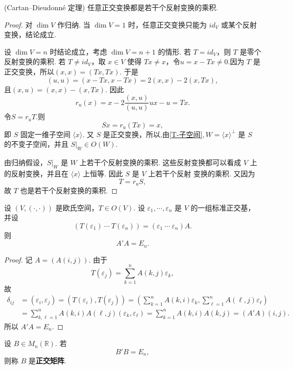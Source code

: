 \begin{proposition}
	(Cartan--Dieudonn\'e 定理)
	任意正交变换都是若干个反射变换的乘积.
\end{proposition}
\begin{proof}
	 对 $\dim V$ 作归纳.
	当 $\dim V=1$ 时，任意正交变换只能为 $id_V$ 或某个反射变换，结论成立.
	
	设 $\dim V=n$ 时结论成立，考虑 $\dim V=n+1$ 的情形.
	若 $T=id_V$，则 $T$ 是零个反射变换的乘积. 若 $T\neq id_V$，取 $x\in V$ 使得
	$Tx\neq x$，令$u=x-Tx\neq 0. $因为 $T$ 是正交变换，所以$(x,x)=(Tx,Tx).$
	于是
	\[
	(u,u)=(x-Tx,x-Tx)=2(x,x)-2(x,Tx),
	\]
	且$(x,u)=(x,x)-(x,Tx). $
	因此
	\[
	r_u(x)=x-2\frac{(x,u)}{(u,u)}ux-u=
	Tx.\]
	令$S=r_uT. $则
	\[
	Sx=r_u(Tx)=x,
	\]
	即 $S$ 固定一维子空间 $\langle x\rangle$.
	又 $S$ 是正交变换，所以,由\ref{T-子空间}$, W=\langle x\rangle^\perp$
	是 $S$ 的不变子空间，并且 $S|_W\in O(W)$.
	
	由归纳假设，$S|_W$ 是 $W$ 上若干个反射变换的乘积. 这些反射变换都可以看成
	$V$ 上的反射变换，并且在 $\langle x\rangle$ 上恒等. 因此 $S$ 是 $V$ 上若干个反射
	变换的乘积. 又因为
	\[
	T=r_uS,
	\]
	故 $T$ 也是若干个反射变换的乘积.
	
\end{proof}
\begin{example}
	设 $(V,(\cdot,\cdot))$ 是欧氏空间，$T\in O(V)$. 设 $\varepsilon_1,\cdots,\varepsilon_n$ 是 $V$ 的一组标准正交基，并设
	\[
	(T(\varepsilon_1)\ \cdots\ T(\varepsilon_n))=(\varepsilon_1\ \cdots\ \varepsilon_n)A.
	\]
	则
	\[
	A'A=E_n.
	\]
\end{example}
\begin{proof}
	记 $A=(A(i,j))$. 由于
	\[
	T(\varepsilon_j)=\sum_{k=1}^{n}A(k,j)\varepsilon_k,
	\]
	故
	\[
	\begin{aligned}
		\delta_{ij}
		&=(\varepsilon_i,\varepsilon_j)=(T(\varepsilon_i),T(\varepsilon_j))=\left(\sum_{k=1}^{n}A(k,i)\varepsilon_k,
		\sum_{\ell=1}^{n}A(\ell,j)\varepsilon_\ell\right)\\
		&=\sum_{k,\ell=1}^{n}A(k,i)A(\ell,j)(\varepsilon_k,\varepsilon_\ell)
		=\sum_{k=1}^{n}A(k,i)A(k,j)=(A'A)(i,j).
	\end{aligned}
	\]
	所以 $A'A=E_n$.
\end{proof}

\begin{definition}
	设 $B\in M_n(\mathbb{R})$. 若
	\[
	B'B=E_n,
	\]
	则称 $B$ 是\textbf{正交矩阵}.
\end{definition}

